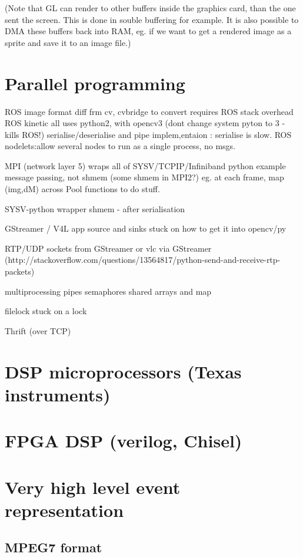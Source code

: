 \documentclass[oneside,english]{scrbook}
\begin{document}
(Note that GL can render to other buffers inside the graphics card, than the one sent the screen. This is done in souble buffering for example. It is also possible to DMA these buffers back into RAM, eg. if we want to get a rendered image as a sprite and save it to an image file.)

\chapter{Parallel programming}

ROS image format diff frm cv, cvbridge to convert requires ROS stack
overhead ROS kinetic all uses python2, with opencv3 (dont change system
pyton to 3 - kills ROS!) serialise/deserialise and pipe implem,entaion
: serialise is slow. ROS nodelets:allow several nodes to run as a
single process, no msgs.

MPI (network layer 5) wraps all of SYSV/TCPIP/Infiniband python example
message passing, not shmem (some shmem in MPI2?) eg. at each frame,
map (img,dM) across Pool functions to do stuff.

SYSV-python wrapper shmem - after serialisation

GStreamer / V4L app source and sinks stuck on how to get it into opencv/py

RTP/UDP sockets from GStreamer or vlc via GStreamer (http://stackoverflow.com/questions/13564817/python-send-and-receive-rtp-packets)

multiprocessing pipes semaphores shared arrays and map

filelock stuck on a lock

Thrift (over TCP)


\chapter{DSP microprocessors (Texas instruments)}

\chapter{FPGA DSP (verilog, Chisel)}


\chapter{Very high level event representation}

\section{MPEG7 format}
\end{document}
